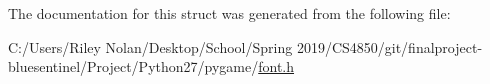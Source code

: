 The documentation for this struct was generated from the following file\+:\begin{DoxyCompactItemize}
\item 
C\+:/\+Users/\+Riley Nolan/\+Desktop/\+School/\+Spring 2019/\+C\+S4850/git/finalproject-\/bluesentinel/\+Project/\+Python27/pygame/\mbox{\hyperlink{font_8h}{font.\+h}}\end{DoxyCompactItemize}
